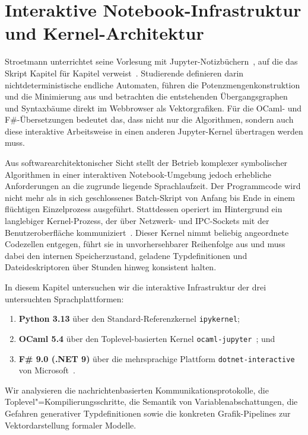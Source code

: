 \chapter{Interaktive Notebook-Infrastruktur und Kernel-Architektur}
\label{chap:interactive_kernels}

Stroetmann unterrichtet seine Vorlesung mit Jupyter-Notizbüchern~\cite{kluyver2016jupyter,perez2007ipython}, auf die das Skript Kapitel für Kapitel verweist~\cite{stroetmann2026formal}.
Studierende definieren darin nichtdeterministische endliche Automaten, führen die Potenzmengenkonstruktion und die Minimierung aus und betrachten die entstehenden Übergangsgraphen und Syntaxbäume direkt im Webbrowser als Vektorgrafiken.
Für die OCaml- und F\#-Übersetzungen bedeutet das, dass nicht nur die Algorithmen, sondern auch diese interaktive Arbeitsweise in einen anderen Jupyter-Kernel übertragen werden muss.

Aus softwarearchitektonischer Sicht stellt der Betrieb komplexer symbolischer Algorithmen in einer interaktiven Notebook-Umgebung jedoch erhebliche Anforderungen an die zugrunde liegende Sprachlaufzeit.
Der Programmcode wird nicht mehr als in sich geschlossenes Batch-Skript von Anfang bis Ende in einem flüchtigen Einzelprozess ausgeführt.
Stattdessen operiert im Hintergrund ein langlebiger Kernel-Prozess, der über Netzwerk- und IPC-Sockets mit der Benutzeroberfläche kommuniziert~\cite{hintjens2013zeromq}.
Dieser Kernel nimmt beliebig angeordnete Codezellen entgegen, führt sie in unvorhersehbarer Reihenfolge aus und muss dabei den internen Speicherzustand, geladene Typdefinitionen und Dateideskriptoren über Stunden hinweg konsistent halten.

In diesem Kapitel untersuchen wir die interaktive Infrastruktur der drei untersuchten Sprachplattformen:
\begin{enumerate}
  \item \textbf{Python 3.13} über den Standard-Referenzkernel \texttt{ipykernel};
  \item \textbf{OCaml 5.4} über den Toplevel-basierten Kernel \texttt{ocaml-jupyter}~\cite{akabe2024ocaml}; und
  \item \textbf{F\# 9.0 (.NET 9)} über die mehrsprachige Plattform \texttt{dotnet-interactive} von Microsoft~\cite{dotnetinteractive2024}.
\end{enumerate}
Wir analysieren die nachrichtenbasierten Kommunikationsprotokolle, die Toplevel"=Kompilierungsschritte, die Semantik von Variablenabschattungen, die Gefahren generativer Typdefinitionen sowie die konkreten Grafik-Pipelines zur Vektordarstellung formaler Modelle.

